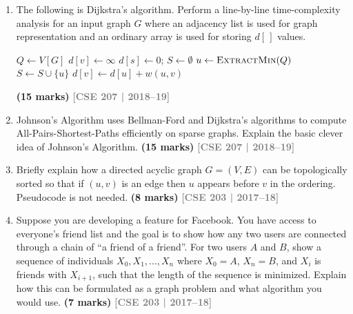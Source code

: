 \documentclass[12pt,a3paper]{article}
\newcommand{\yr}[1]{\hfill\textcolor{gray}{\small\textbf{[#1]}}}
\newcommand{\mk}[1]{\textcolor{orange!70!black}{\small\textbf{(#1 marks)}}}
\begin{document}
\begin{enumerate}
\item The following is Dijkstra's algorithm. Perform a line-by-line time-complexity analysis for an input graph $G$ where an adjacency list is used for graph representation and an ordinary array is used for storing $d[\,]$ values.
\begin{algorithm}[H]
\begin{algorithmic}[1]
\State $Q \gets V[G]$
\State $d[v] \gets \infty$ \EndFor
\State $d[s] \gets 0$; $S \gets \emptyset$
  \State $u \gets \textsc{ExtractMin}(Q)$
  \State $S \gets S \cup \{u\}$
      \State $d[v] \gets d[u] + w(u,v)$
    \EndIf
  \EndFor
\EndWhile
\end{algorithmic}
\end{algorithm}
\mk{15}
\yr{CSE 207 | 2018--19}

\item Johnson's Algorithm uses Bellman-Ford and Dijkstra's algorithms to compute All-Pairs-Shortest-Paths efficiently on sparse graphs. Explain the basic clever idea of Johnson's Algorithm. \mk{15}
\yr{CSE 207 | 2018--19}

\item Briefly explain how a directed acyclic graph $G = (V, E)$ can be topologically sorted so that if $(u, v)$ is an edge then $u$ appears before $v$ in the ordering. Pseudocode is not needed. \mk{8}
\yr{CSE 203 | 2017--18}

\item Suppose you are developing a feature for Facebook. You have access to everyone's friend list and the goal is to show how any two users are connected through a chain of ``a friend of a friend''. For two users $A$ and $B$, show a sequence of individuals $X_0, X_1, \ldots, X_n$ where $X_0 = A$, $X_n = B$, and $X_i$ is friends with $X_{i+1}$, such that the length of the sequence is minimized. Explain how this can be formulated as a graph problem and what algorithm you would use. \mk{7}
\yr{CSE 203 | 2017--18}


\end{enumerate}
\end{document}
